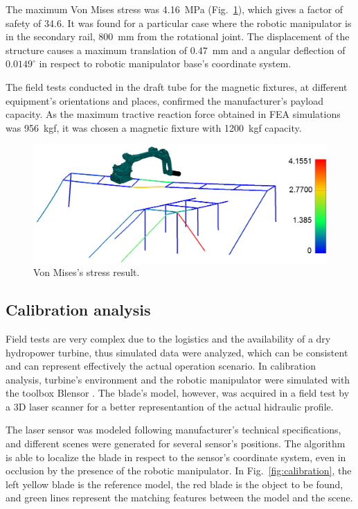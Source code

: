 The maximum Von Mises stress was 4.16~MPa (Fig.~\ref{fig:von_mises}), which
gives a factor of safety of 34.6. It was found for a particular case where the robotic manipulator is in
the secondary rail, 800~mm from the rotational joint. The displacement of the
structure causes a maximum translation of 0.47~mm and a angular deflection of
$0.0149^{\circ}$ in respect to robotic manipulator base's coordinate system. 

The field tests conducted in the draft tube for the magnetic fixtures, at
different equipment's orientations and places, confirmed the manufacturer's
payload capacity. As the maximum tractive reaction force obtained in FEA
simulations was 956~kgf, it was chosen a magnetic fixture with 1200~kgf
capacity.

\begin{figure}
	\centering
	\includegraphics[width=.95\columnwidth]{figs/mecanica/von_mises.png}
    \caption{Von Mises's stress result.}
    \label{fig:von_mises}
\end{figure}

\subsection{Calibration analysis}

Field tests are very complex due to the logistics and the availability of a dry
hydropower turbine, thus simulated data were analyzed, which can be consistent
and can represent effectively the actual operation scenario. In calibration
analysis, turbine's environment and the robotic manipulator were simulated with
the toolbox Blensor \cite{Gschwandtner11b}. The blade's model, however, was
acquired in a field test by a 3D laser scanner for a better representantion of
the actual hidraulic profile.

The laser sensor was modeled following manufacturer's technical
specifications, and different scenes were generated for several sensor's
positions. The algorithm is able to localize the blade in respect to the
sensor's coordinate system, even in occlusion by the presence of the robotic
manipulator. In Fig.~\ref{fig:calibration}, the left yellow blade is the
reference model, the red blade is the object to be found, and green lines
represent the matching features between the model and the scene.


